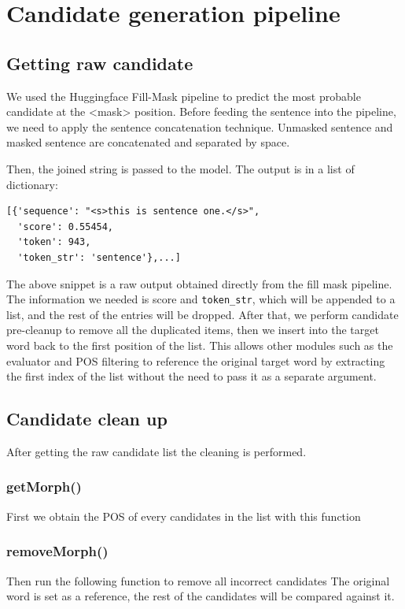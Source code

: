 \documentclass[12pt,oneside,openright,a4paper]{cpe-english-project}
\begin{document}
\section{Candidate generation pipeline}

\subsection{Getting raw candidate}
We used the Huggingface Fill-Mask pipeline to predict the most probable candidate at the <mask> position. Before feeding the sentence into the pipeline, we need to apply the sentence concatenation technique. Unmasked sentence and masked sentence are concatenated and separated by space. 

Then, the joined string is passed to the model. The output is in a list of dictionary:



\begin{verbatim}
[{'sequence': "<s>this is sentence one.</s>",
  'score': 0.55454,
  'token': 943,
  'token_str': 'sentence'},...]
\end{verbatim}

The above snippet is a raw output obtained directly from the fill mask pipeline. The information we needed is score and \verb/token_str/, which will be appended to a list, and the rest of the entries will be dropped. After that, we perform candidate pre-cleanup to remove all the duplicated items, then we insert into the target word back to the first position of the list. This allows other modules such as the evaluator and POS filtering to reference the original target word by extracting the first index of the list without the need to pass it as a separate argument. 

\subsection{Candidate clean up}
After getting the raw candidate list the cleaning is performed.
\subsubsection{getMorph()}
First we obtain the POS of every candidates in the list with this function 

\subsubsection{removeMorph()}
Then run the following function to remove all incorrect candidates
The original word is set as a reference, the rest of the candidates will be compared against it.
\end{document}
